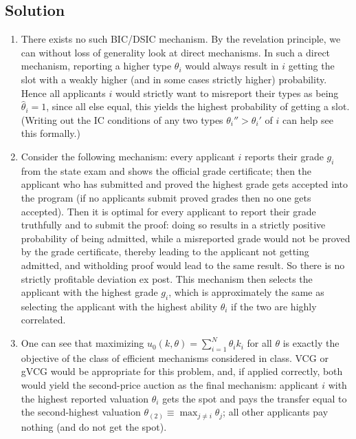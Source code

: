 \documentclass[a4paper]{article}
\begin{document}
\subsection*{Solution}
\begin{enumerate}
	\item There exists no such BIC/DSIC mechanism. By the revelation principle, we can without loss of generality look at direct mechanisms. In such a direct mechanism, reporting a higher type $\theta_i$ would always result in $i$ getting the slot with a weakly higher (and in some cases strictly higher) probability. Hence all applicants $i$ would strictly want to misreport their types as being $\hat{\theta}_i=1$, since all else equal, this yields the highest probability of getting a slot. (Writing out the IC conditions of any two types $\theta_i''>\theta_i'$ of $i$ can help see this formally.)
	
	\item Consider the following mechanism: every applicant $i$ reports their grade $g_i$ from the state exam and shows the official grade certificate; then the applicant who has submitted and proved the highest grade gets accepted into the program (if no applicants submit proved grades then no one gets accepted).
	Then it is optimal for every applicant to report their grade truthfully and to submit the proof: doing so results in a strictly positive probability of being admitted, while a misreported grade would not be proved by the grade certificate, thereby leading to the applicant not getting admitted, and witholding proof would lead to the same result.
	So there is no strictly profitable deviation ex post. This mechanism then selects the applicant with the highest grade $g_i$, which is approximately the same as selecting the applicant with the highest ability $\theta_i$ if the two are highly correlated.
	
	\item One can see that maximizing $u_0(k,\theta) = \sum_{i=1}^N \theta_i k_i$ for all $\theta$ is exactly the objective of the class of efficient mechanisms considered in class. VCG or gVCG would be appropriate for this problem, and, if applied correctly, both would yield the second-price auction as the final mechanism: applicant $i$ with the highest reported valuation $\theta_i$ gets the spot and pays the transfer equal to the second-highest valuation $\theta_{(2)} \equiv \max_{j \neq i} \theta_j$; all other applicants pay nothing (and do not get the spot). 
\end{enumerate}
\fi
\end{document}
